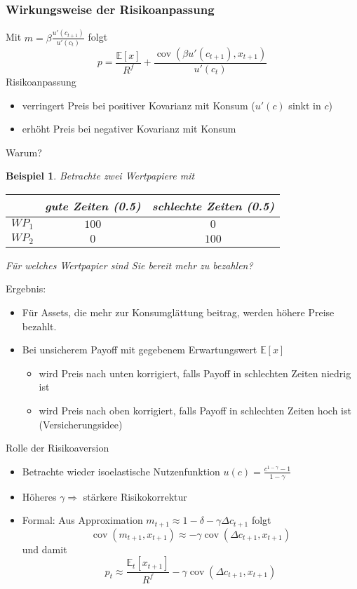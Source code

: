 \documentclass[12pt]{extreport} %
\theoremstyle{named}
\theoremstyle{nnamed}
\theoremstyle{itshape}
\theoremstyle{normal}
\newtheorem*{beispiel}{Beispiel}
\begin{document}
\subsubsection{Wirkungsweise der Risikoanpassung}

Mit $m = \beta \frac{u'(c_{t+1})}{u'(c_t)}$ folgt
	$$	p = \frac{\mathbb{E}[x]}{R^f} + \frac{\operatorname{cov}(\beta u'(c_{t+1}), x_{t+1})}{u'(c_t)} $$
Risikoanpassung
\begin{itemize}
	\item verringert Preis bei positiver Kovarianz mit Konsum ($u'(c)$ sinkt in $c$)
	\item erhöht Preis bei negativer Kovarianz mit Konsum
\end{itemize}
Warum?

\begin{beispiel}
	Betrachte zwei Wertpapiere mit 
	
	\begin{figure*}[h!] \centering
		\begin{tabular}{l|cc}
  			~  & gute Zeiten (0.5) & schlechte Zeiten (0.5) \\
  			\hline
 			$WP_1$ & $100$ & $0$ \\
  			$WP_2$ & $0$ & $100$
		\end{tabular}
	\end{figure*} 


	Für welches Wertpapier sind Sie bereit mehr zu bezahlen?	
\end{beispiel}


Ergebnis:
\begin{itemize}
	\item Für Assets, die mehr zur Konsumglättung beitrag, werden höhere Preise bezahlt.
	\item Bei unsicherem Payoff mit gegebenem Erwartungswert $\mathbb{E}[x]$
		\begin{itemize}
			\item wird Preis nach unten korrigiert, falls Payoff in schlechten Zeiten niedrig ist
			\item wird Preis nach oben korrigiert, falls Payoff in schlechten Zeiten hoch ist (Versicherungsidee)
		\end{itemize}
\end{itemize}

Rolle der Risikoaversion
\begin{itemize}
	\item Betrachte wieder isoelastische Nutzenfunktion $u(c) = \frac{c^{1-\gamma} - 1}{1 - \gamma}$
	\item Höheres $\gamma \Rightarrow$ stärkere Risikokorrektur
	\item Formal: Aus Approximation $m_{t+1} \approx 1 - \delta - \gamma \Delta c_{t+1}$ folgt 
		$$ \operatorname{cov}(m_{t+1}, x_{t+1}) \approx - \gamma \operatorname{cov}(\Delta c_{t+1}, x_{t+1}) $$
		und damit
		$$	p_t \approx \frac{\mathbb{E}_t[x_{t+1}]}{R^f} - \gamma \operatorname{cov}(\Delta c_{t+1}, x_{t+1}) $$
\end{itemize}
\end{document}

